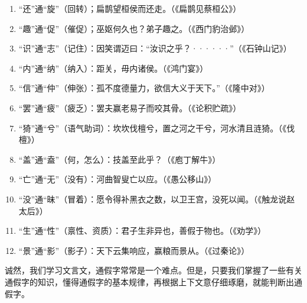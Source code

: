 \begin{enumerate}[label=\textcircled{\arabic*}]
\item “还”通“旋”（回转）；扁鹊望桓侯而还走。（《扁鹊见蔡桓公》）
\item “趣”通“促”（催促）；巫妪何久也？弟子趣之。（《西门豹治邺》）
\item  “识”通“志”（记住）：因笑谓迈曰：“汝识之乎？······”（《石钟山记》）
\item  “内”通“纳”（纳入）：距关，毋内诸侯。（《鸿门宴》）
\item  “信”通“仲”（伸张）：孤不度德量力，欲信大义于天下。”（《隆中对》）
\item  “罢”通“疲”（疲乏）：罢夫赢老易子而咬其骨。（《论积贮疏》）
\item  “猗”通“兮”（语气助词）：坎坎伐檀兮，置之河之干兮，河水清且涟猗。（《伐檀》）
\item  “盖”通“盍”（何，怎么）：技盖至此乎？（《庖丁解牛》）
\item  “亡”通“无”（没有）：河曲智叟亡以应。（《愚公移山》）
\item  “没”通“昧”（冒着）：愿令得补黑衣之数，以卫王宫，没死以闻。（《触龙说赵太后》）
\item  “生”通“性”（禀性、资质）：君子生非异也，善假于物也。（《劝学》）
\item  “景”通“影”（影子）：天下云集响应，赢粮而景从。（《过秦论》）
\end{enumerate}

诚然，我们学习文言文，通假字常常是一个难点。但是，只要我们掌握了一些有关通假字的知识，懂得通假字的基本规律，再根据上下文意仔细琢磨，就能判断出通假字。
\newpage
